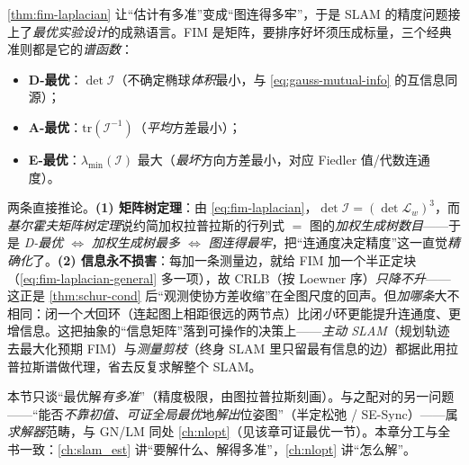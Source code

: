 \begin{insight}
\cref{thm:fim-laplacian} 让“估计有多准”变成“图连得多牢”，于是 SLAM 的精度问题接上了\emph{最优实验设计}的成熟语言。FIM 是矩阵，要排序好坏须压成标量，三个经典准则都是它的\emph{谱函数}：
\begin{itemize}
  \item \textbf{D-最优}：$\det\boldsymbol{\mathcal{I}}$（不确定椭球\emph{体积}最小，与 \cref{eq:gauss-mutual-info} 的互信息同源）；
  \item \textbf{A-最优}：$\mathrm{tr}(\boldsymbol{\mathcal{I}}^{-1})$（\emph{平均}方差最小）；
  \item \textbf{E-最优}：$\lambda_{\min}(\boldsymbol{\mathcal{I}})$ 最大（\emph{最坏}方向方差最小，对应 Fiedler 值/代数连通度）。
\end{itemize}
两条直接推论。\textbf{(1) 矩阵树定理}：由 \cref{eq:fim-laplacian}，$\det\boldsymbol{\mathcal{I}}=(\det\boldsymbol{\mathcal{L}}_w)^3$，而\emph{基尔霍夫矩阵树定理}说约简加权拉普拉斯的行列式 $=$ 图的\emph{加权生成树数目}\cite{carlone2026handbook}——于是 \emph{D-最优 $\Leftrightarrow$ 加权生成树最多 $\Leftrightarrow$ 图连得最牢}，把“连通度决定精度”这一直觉\emph{精确化}了。\textbf{(2) 信息永不损害}：每加一条测量边，就给 FIM 加一个半正定块（\cref{eq:fim-laplacian-general} 多一项），故 CRLB（按 Loewner 序）\emph{只降不升}——这正是 \cref{thm:schur-cond} 后“观测使协方差收缩”在全图尺度的回声。但\emph{加哪条}大不相同：闭一个\emph{大}回环（连起图上相距很远的两节点）比闭\emph{小}环更能提升连通度、更增信息。这把抽象的“信息矩阵”落到可操作的决策上——\emph{主动 SLAM}（规划轨迹去最大化预期 FIM）与\emph{测量剪枝}（终身 SLAM 里只留最有信息的边）都据此用拉普拉斯谱做代理，省去反复求解整个 SLAM\cite{carlone2026handbook}。
\end{insight}

\begin{note}[本节边界]
本节只谈“最优解\emph{有多准}”（精度极限，由图拉普拉斯刻画）。与之配对的另一问题——“能否\emph{不靠初值、可证全局最优}地\emph{解出}位姿图”（半定松弛 / SE-Sync）——属\emph{求解器}范畴，与 GN/LM 同处 \cref{ch:nlopt}（见该章可证最优一节）。本章分工与全书一致：\cref{ch:slam_est} 讲“要解什么、解得多准”，\cref{ch:nlopt} 讲“怎么解”。
\end{note}

